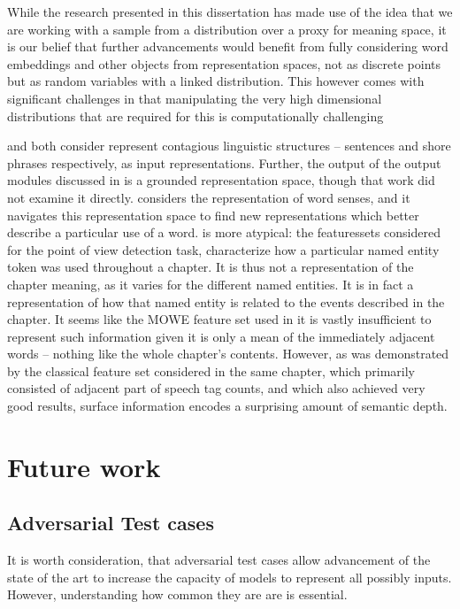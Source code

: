 \documentclass{book}
\begin{document}
While the research presented in this dissertation has made use of the idea that we are working with a sample from a distribution over a proxy for meaning space,
it is our belief that further advancements would benefit from fully considering
word embeddings and other objects from representation spaces, not as discrete points but as random variables with a linked distribution.
This however comes with significant challenges in that manipulating the very high dimensional distributions that are required for this is computationally challenging



 and  both consider represent contagious linguistic structures -- sentences and shore phrases respectively, as input representations.
Further, the output of the output modules discussed in  is a grounded representation space, though that work did not examine it directly.
 considers the representation of word senses, and it navigates this representation space to find new representations which better describe a particular use of a word.
 is more atypical:
the featuressets considered for the point of view detection task,
characterize how a particular named entity token was used throughout a chapter.
It is thus not a representation of the chapter meaning, as it varies for the different named entities.
It is in fact a representation of how that named entity is related to the events described in the chapter.
It seems like the MOWE feature set used in  it is vastly insufficient to represent such information given it is only a mean of the immediately adjacent words -- nothing like the whole chapter's contents.
However, as was demonstrated by the classical feature set considered in the same chapter, which primarily consisted of adjacent part of speech tag counts, and which also achieved very good results, surface information encodes a surprising amount of semantic depth.


\section{Future work}

\subsection{Adversarial Test cases}
It is worth consideration,
that adversarial test cases allow advancement of the state of the art to increase the capacity of models to represent all possibly inputs.
However, understanding how common they are are is essential.
\end{document}
